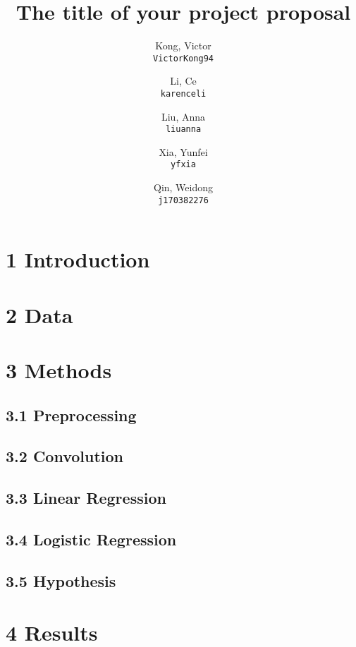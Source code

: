 \documentclass[11pt]{article}
\title{The title of your project proposal}
\author{
  Kong, Victor\\
  \texttt{VictorKong94}
  \and
  Li, Ce\\
  \texttt{karenceli}
  \and
  Liu, Anna\\
  \texttt{liuanna}
  \and
  Xia, Yunfei\\
  \texttt{yfxia}
  \and
  Qin, Weidong\\
  \texttt{j170382276}
}
\begin{document}
\maketitle

\abstract{}

\section{1 Introduction}
        

\section{2 Data}
        

\section{3 Methods}

    \subsection{3.1 Preprocessing}
            
            
    \subsection{3.2 Convolution}
            
            
    \subsection{3.3 Linear Regression}
            
            
    \subsection{3.4 Logistic Regression}
            
            
    \subsection{3.5 Hypothesis}
            

\section{4 Results}
\end{document}
